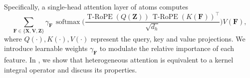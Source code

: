 Specifically, a single-head attention layer of \gls{atoms} computes 
\begin{equation*}
    \sum_{\mathbf F   \in \{{\mathbf{X}}, {\mathbf{V}}, {\mathbf{Z}} \}} \gamma_{\mathbf F}  \, \operatorname{softmax} \Big( \frac{ \operatorname{T-RoPE}(Q({\mathbf{Z}})) \, \operatorname{T-RoPE}( K(\mathbf F) )^\top}{\sqrt{d_h}} \Big) 
     V(\mathbf F),
\end{equation*}
where $Q(\cdot), K(\cdot), V(\cdot)$ represent the query, key and value projections. 
We introduce learnable weights $\gamma_{\mathbf F}$ to modulate the relative importance of each feature. 
In , we show that heterogeneous attention is equivalent to a kernel integral operator and discuss its properties.






